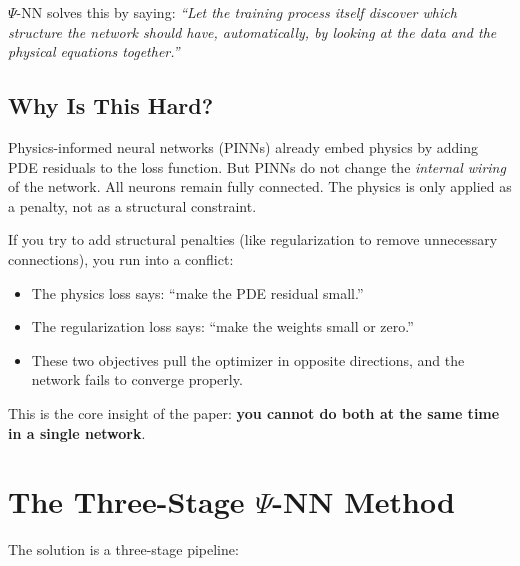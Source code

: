 \documentclass[11pt,a4paper]{article}
\begin{document}
$\Psi$-NN solves this by saying: \textit{``Let the training process itself discover which structure the network should have, automatically, by looking at the data and the physical equations together.''}

\subsection{Why Is This Hard?}

Physics-informed neural networks (PINNs) already embed physics by adding PDE residuals to the loss function. But PINNs do not change the \textit{internal wiring} of the network. All neurons remain fully connected. The physics is only applied as a penalty, not as a structural constraint.

If you try to add structural penalties (like regularization to remove unnecessary connections), you run into a conflict:

\begin{itemize}[nosep]
    \item The physics loss says: ``make the PDE residual small.''
    \item The regularization loss says: ``make the weights small or zero.''
    \item These two objectives pull the optimizer in opposite directions, and the network fails to converge properly.
\end{itemize}

This is the core insight of the paper: \textbf{you cannot do both at the same time in a single network}.

\section{The Three-Stage $\Psi$-NN Method}

The solution is a three-stage pipeline:
\end{document}
